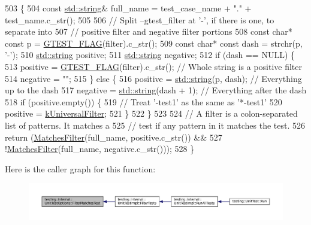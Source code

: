 \begin{DoxyCode}
503                                                                     \{
504   \textcolor{keyword}{const} \hyperlink{namespacetesting_1_1internal_a8e8ff5b11e64078831112677156cb111}{std::string}& full\_name = test\_case\_name + \textcolor{stringliteral}{"."} + test\_name.c\_str();
505 
506   \textcolor{comment}{// Split --gtest\_filter at '-', if there is one, to separate into}
507   \textcolor{comment}{// positive filter and negative filter portions}
508   \textcolor{keyword}{const} \textcolor{keywordtype}{char}* \textcolor{keyword}{const} p = \hyperlink{gtest-port_8h_a828f4e34a1c4b510da50ec1563e3562a}{GTEST\_FLAG}(filter).c\_str();
509   \textcolor{keyword}{const} \textcolor{keywordtype}{char}* \textcolor{keyword}{const} dash = strchr(p, \textcolor{charliteral}{'-'});
510   \hyperlink{namespacetesting_1_1internal_a8e8ff5b11e64078831112677156cb111}{std::string} positive;
511   \hyperlink{namespacetesting_1_1internal_a8e8ff5b11e64078831112677156cb111}{std::string} negative;
512   \textcolor{keywordflow}{if} (dash == NULL) \{
513     positive = \hyperlink{gtest-port_8h_a828f4e34a1c4b510da50ec1563e3562a}{GTEST\_FLAG}(filter).c\_str();  \textcolor{comment}{// Whole string is a positive filter}
514     negative = \textcolor{stringliteral}{""};
515   \} \textcolor{keywordflow}{else} \{
516     positive = \hyperlink{namespacetesting_1_1internal_a8e8ff5b11e64078831112677156cb111}{std::string}(p, dash);   \textcolor{comment}{// Everything up to the dash}
517     negative = \hyperlink{namespacetesting_1_1internal_a8e8ff5b11e64078831112677156cb111}{std::string}(dash + 1);  \textcolor{comment}{// Everything after the dash}
518     \textcolor{keywordflow}{if} (positive.empty()) \{
519       \textcolor{comment}{// Treat '-test1' as the same as '*-test1'}
520       positive = \hyperlink{namespacetesting_a236f8612e4b148d8d989a311a30a4557}{kUniversalFilter};
521     \}
522   \}
523 
524   \textcolor{comment}{// A filter is a colon-separated list of patterns.  It matches a}
525   \textcolor{comment}{// test if any pattern in it matches the test.}
526   \textcolor{keywordflow}{return} (\hyperlink{classtesting_1_1internal_1_1UnitTestOptions_a67fc0adaffbb8d320b92e42e05017e4e}{MatchesFilter}(full\_name, positive.c\_str()) &&
527           !\hyperlink{classtesting_1_1internal_1_1UnitTestOptions_a67fc0adaffbb8d320b92e42e05017e4e}{MatchesFilter}(full\_name, negative.c\_str()));
528 \}
\end{DoxyCode}
Here is the caller graph for this function\+:
\nopagebreak
\begin{figure}[H]
\begin{center}
\leavevmode
\includegraphics[width=350pt]{classtesting_1_1internal_1_1UnitTestOptions_a9975b59cece94874b303421697e3bca6_icgraph}
\end{center}
\end{figure}
